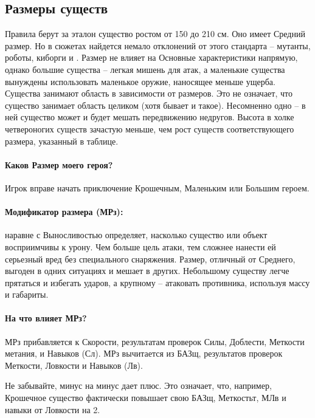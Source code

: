 \subsection{Размеры существ}
Правила берут за эталон существо ростом от 150 до 210 см. Оно имеет Средний размер. Но в сюжетах найдется немало отклонений от этого стандарта – мутанты, роботы, киборги и \tbd.
\newline Размер не влияет на Основные характеристики напрямую, однако большие существа – легкая мишень для атак, а маленькие существа вынуждены использовать маленькое оружие, наносящее меньше ущерба.
\newline Существа занимают область в зависимости от размеров. Это не означает, что существо занимает область целиком (хотя бывает и такое). Несомненно одно – в ней существо может и будет мешать передвижению недругов.
\newline Высота в холке четвероногих существ зачастую меньше, чем рост существ соответствующего размера, указанный в таблице.

\paragraph{Каков Размер моего героя?} Игрок вправе начать приключение Крошечным, Маленьким или Большим героем. 

\paragraph{Модификатор размера (МРз):} наравне с Выносливостью определяет, насколько существо или объект восприимчивы к урону. Чем больше цель атаки, тем сложнее нанести ей серьезный вред без специального снаряжения.
\newline Размер, отличный от Среднего, выгоден в одних ситуациях и мешает в других. Небольшому существу легче прятаться и избегать ударов, а крупному – атаковать противника, используя массу и габариты. 
\paragraph{На что влияет МРз?} МРз прибавляется к Скорости, результатам проверок Силы, Доблести, Меткости метания, и Навыков (Сл).
\newline МРз вычитается из БАЗщ, результатов проверок Меткости, Ловкости и Навыков (Лв).
\begin{tcolorbox}
    Не забывайте, минус на минус дает плюс. Это означает, что, например, Крошечное существо фактически повышает свою БАЗщ, Меткостьт, МЛв и навыки от Ловкости на 2.
\end{tcolorbox}

